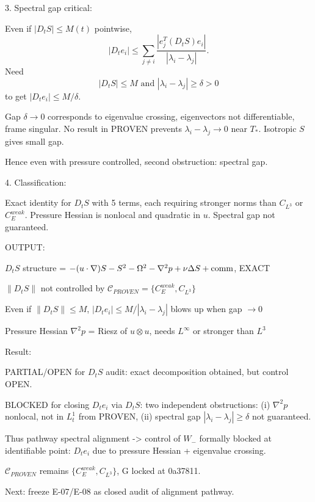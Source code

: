 \documentclass[11pt]{article}
\begin{document}
3. Spectral gap critical:

Even if $|D_t S|\le M(t)$ pointwise,
\begin{equation*}
|D_t e_i| \le \sum_{j\neq i}\frac{|e_j^T(D_t S)e_i|}{|\lambda_i-\lambda_j|}.
\end{equation*}
Need
\begin{equation*}
\boxed{|D_t S|\le M \text{ and } |\lambda_i-\lambda_j|\ge\delta>0}
\end{equation*}
to get $|D_t e_i|\le M/\delta$.

Gap $\delta\to0$ corresponds to eigenvalue crossing, eigenvectors not differentiable, frame singular. No result in PROVEN prevents $\lambda_i-\lambda_j\to0$ near $T_*$. Isotropic $S$ gives small gap.

Hence even with pressure controlled, second obstruction: spectral gap.

4. Classification:

Exact identity for $D_t S$ with 5 terms, each requiring stronger norms than $C_{L^3}$ or $C_E^{weak}$.
Pressure Hessian is nonlocal and quadratic in $u$.
Spectral gap not guaranteed.

OUTPUT:

$D_t S$ structure = $-(u\cdot\nabla)S -S^2-\Omega^2 -\nabla^2 p +\nu\Delta S + {\rm comm}$, EXACT

$\|D_t S\|$ not controlled by $\mathcal{C}_{PROVEN}=\{C_E^{weak},C_{L^3}\}$

Even if $\|D_t S\|\le M$, $|D_t e_i|\le M/|\lambda_i-\lambda_j|$ blows up when gap $\to0$

Pressure Hessian $\nabla^2 p$ = Riesz of $u\otimes u$, needs $L^\infty$ or stronger than $L^3$

Result:

PARTIAL/OPEN for $D_t S$ audit: exact decomposition obtained, but control OPEN.

BLOCKED for closing $D_t e_i$ via $D_t S$: two independent obstructions:
(i) $\nabla^2 p$ nonlocal, not in $L^1_t$ from PROVEN,
(ii) spectral gap $|\lambda_i-\lambda_j|\ge\delta$ not guaranteed.

Thus pathway spectral alignment -> control of $W_-$ formally blocked at identifiable point: $D_t e_i$ due to pressure Hessian + eigenvalue crossing.

$\mathcal{C}_{PROVEN}$ remains $\{C_E^{weak},C_{L^3}\}$, G locked at 0a37811.

Next: freeze E-07/E-08 as closed audit of alignment pathway.
\end{document}
